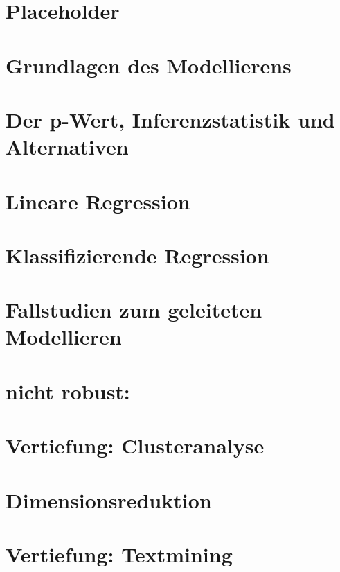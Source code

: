 \documentclass[12pt,ngerman,]{book}
\begin{document}
\chapter{Placeholder}\label{placeholder}

\chapter{Grundlagen des Modellierens}\label{mod1}

\chapter{Der p-Wert, Inferenzstatistik und
Alternativen}\label{der-p-wert-inferenzstatistik-und-alternativen}

\chapter{Lineare Regression}\label{lineare-regression}

\chapter{Klassifizierende Regression}\label{klassifizierende-regression}

\chapter{Fallstudien zum geleiteten
Modellieren}\label{fallstudien-zum-geleiteten-modellieren}

\chapter{nicht robust:}\label{nicht-robust}

\chapter{Vertiefung: Clusteranalyse}\label{cluster}

\chapter{Dimensionsreduktion}\label{dimensionsreduktion}

\chapter{Vertiefung: Textmining}\label{vertiefung-textmining}
\end{document}
